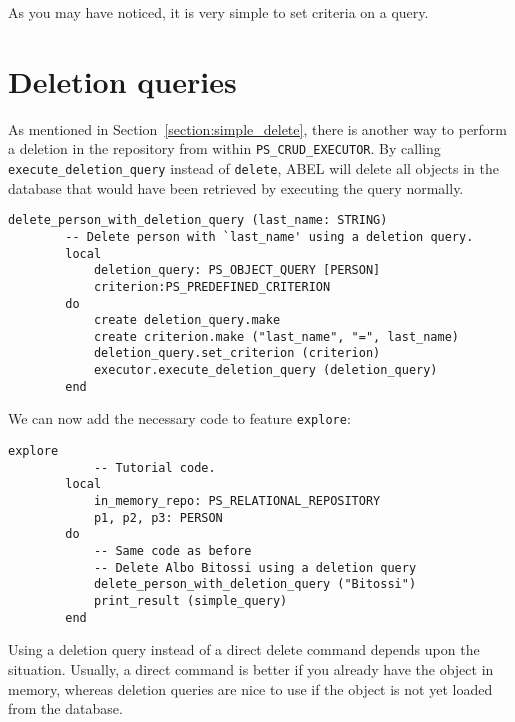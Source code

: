 \documentclass[a4paper,12pt]{report}
\begin{document}
As you may have noticed, it is very simple to set criteria on a query.

\section{Deletion queries}
\label{section:deletion_query}

As mentioned in Section~\ref{section:simple_delete}, there is another way to perform a deletion in the repository from within
\lstinline!PS_CRUD_EXECUTOR!. By calling \lstinline{execute_deletion_query} instead of \lstinline{delete}, ABEL will delete all objects in the database that would have been retrieved by executing the query normally.

\begin{lstlisting}[language=OOSC2Eiffel, captionpos=b, caption={Using a deletion query.}, label={lst:deletion_query}]
	delete_person_with_deletion_query (last_name: STRING)
		-- Delete person with `last_name' using a deletion query.
		local
			deletion_query: PS_OBJECT_QUERY [PERSON]
			criterion:PS_PREDEFINED_CRITERION
		do
			create deletion_query.make
			create criterion.make ("last_name", "=", last_name)
			deletion_query.set_criterion (criterion)
			executor.execute_deletion_query (deletion_query)
		end
\end{lstlisting}

We can now add the necessary code to feature \lstinline{explore}:  
\begin{lstlisting}[language=OOSC2Eiffel, captionpos=b, caption={Invoking the code that searches for Albo Bitossi}, label={lst:tutorial_print_result}]
	explore
			-- Tutorial code.
		local
			in_memory_repo: PS_RELATIONAL_REPOSITORY
			p1, p2, p3: PERSON
		do
			-- Same code as before
			-- Delete Albo Bitossi using a deletion query
			delete_person_with_deletion_query ("Bitossi")
			print_result (simple_query)
		end
\end{lstlisting}
Using a deletion query instead of a direct delete command depends upon the situation. Usually, a direct command is better if you already have the object in memory, whereas deletion queries are nice to use if the object is not yet loaded from the database.
\end{document}
